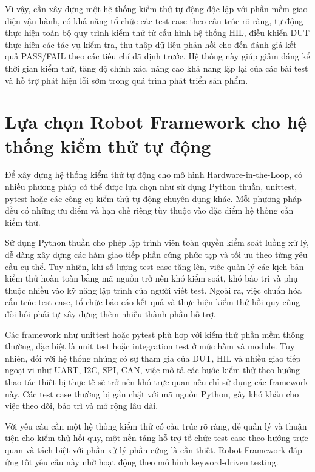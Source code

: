 Vì vậy, cần xây dựng một hệ thống kiểm thử tự động độc lập với phần mềm giao diện vận hành, có khả năng tổ chức các test case theo cấu trúc rõ ràng, tự động thực hiện toàn bộ quy trình kiểm thử từ cấu hình hệ thống HIL, điều khiển DUT thực hiện các tác vụ kiểm tra, thu thập dữ liệu phản hồi cho đến đánh giá kết quả PASS/FAIL theo các tiêu chí đã định trước. Hệ thống này giúp giảm đáng kể thời gian kiểm thử, tăng độ chính xác, nâng cao khả năng lặp lại của các bài test và hỗ trợ phát hiện lỗi sớm trong quá trình phát triển sản phẩm.

\section{Lựa chọn Robot Framework cho hệ thống kiểm thử tự động}

Để xây dựng hệ thống kiểm thử tự động cho mô hình Hardware-in-the-Loop, có nhiều phương pháp có thể được lựa chọn như sử dụng Python thuần, unittest, pytest hoặc các công cụ kiểm thử tự động chuyên dụng khác. Mỗi phương pháp đều có những ưu điểm và hạn chế riêng tùy thuộc vào đặc điểm hệ thống cần kiểm thử.

Sử dụng Python thuần cho phép lập trình viên toàn quyền kiểm soát luồng xử lý, dễ dàng xây dựng các hàm giao tiếp phần cứng phức tạp và tối ưu theo từng yêu cầu cụ thể. Tuy nhiên, khi số lượng test case tăng lên, việc quản lý các kịch bản kiểm thử hoàn toàn bằng mã nguồn trở nên khó kiểm soát, khó bảo trì và phụ thuộc nhiều vào kỹ năng lập trình của người viết test. Ngoài ra, việc chuẩn hóa cấu trúc test case, tổ chức báo cáo kết quả và thực hiện kiểm thử hồi quy cũng đòi hỏi phải tự xây dựng thêm nhiều thành phần hỗ trợ.

Các framework như unittest hoặc pytest phù hợp với kiểm thử phần mềm thông thường, đặc biệt là unit test hoặc integration test ở mức hàm và module. Tuy nhiên, đối với hệ thống nhúng có sự tham gia của DUT, HIL và nhiều giao tiếp ngoại vi như UART, I2C, SPI, CAN, việc mô tả các bước kiểm thử theo hướng thao tác thiết bị thực tế sẽ trở nên khó trực quan nếu chỉ sử dụng các framework này. Các test case thường bị gắn chặt với mã nguồn Python, gây khó khăn cho việc theo dõi, bảo trì và mở rộng lâu dài.

Với yêu cầu cần một hệ thống kiểm thử có cấu trúc rõ ràng, dễ quản lý và thuận tiện cho kiểm thử hồi quy, một nền tảng hỗ trợ tổ chức test case theo hướng trực quan và tách biệt với phần xử lý phần cứng là cần thiết. Robot Framework đáp ứng tốt yêu cầu này nhờ hoạt động theo mô hình keyword-driven testing.


